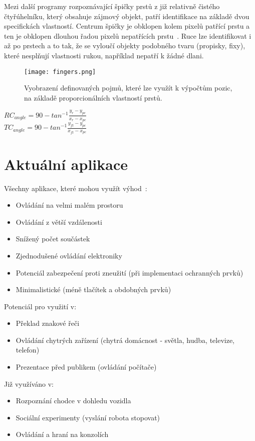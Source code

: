 Mezi další programy rozpoznávající špičky prstů z již relativně čistého čtyřúhelníku, který obsahuje zájmový objekt, patří identifikace na základě dvou specifickách vlastností. Centrum špičky je obklopen kolem pixelů patřící prstu a ten je obklopen dlouhou řadou pixelů nepatřících prstu~\cite{14}. Ruce lze identifikovat i až po prstech a to tak, že se vyloučí objekty podobného tvaru (propisky, fixy), které nesplňují vlastnosti rukou, například nepatří k žádné dlani.




\begin{figure}[h]
\centering
\texttt{[image: fingers.png]}
\caption{Vyobrazení definovaných pojmů, které lze využít k výpočtům pozic, na základě proporcionálních vlastností prstů. ~\cite{13} }

\end{figure}
\begin{center}
$RC_{angle} = 90 - tan^{-1} \frac{y_{r}-y_{pc}}{x_{r} - x_{pc}}$ \\
$TC_{angle} = 90 - tan^{-1} \frac{y_{ft}-y_{pc}}{x_{ft} - x_{pc}}$ 
\end{center}
\section{Aktuální aplikace}
Všechny aplikace, které mohou využít výhod~\cite{14}:
\begin{itemize}
\item Ovládání na velmi malém prostoru
\item Ovládání z větší vzdálenosti
\item Snížený počet součástek
\item Zjednodušené ovládání elektroniky
\item Potenciál zabezpečení proti zneužití (při implementaci ochranných prvků)
\item Minimalistické (méně tlačítek a obdobných prvků)\\
\end{itemize}
Potenciál pro využití v:
\begin{itemize}
\item Překlad znakové řeči
\item Ovládání chytrých zařízení (chytrá domácnost - světla, hudba, televize, telefon)
\item Prezentace před publikem (ovládání počítače)
\\
\end{itemize}
Již využíváno v:
\begin{itemize}
\item Rozpoznání chodce v dohledu vozidla
\item Sociální experimenty (vyslání robota stopovat)
\item Ovládání a hraní na konzolích
\end{itemize}



\endinput
